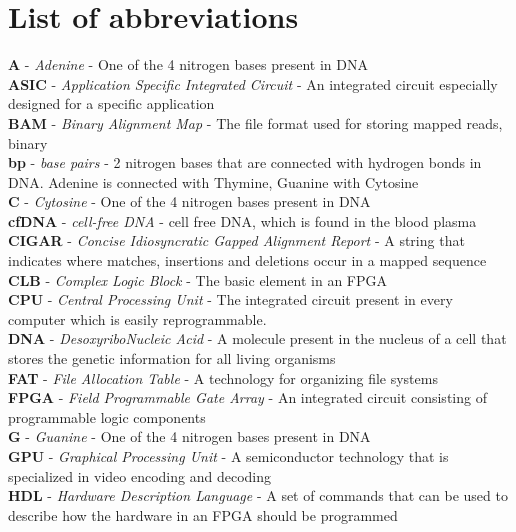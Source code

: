\chapter*{List of abbreviations}


\textbf{A} - \textit{Adenine} - One of the 4 nitrogen bases present in DNA \\
\textbf{ASIC} - \textit{Application Specific Integrated Circuit} - An integrated circuit especially designed for a specific application \\
\textbf{BAM} - \textit{Binary Alignment Map} - The file format used for storing mapped reads, binary \\
\textbf{bp} - \textit{base pairs} - 2 nitrogen bases that are connected with hydrogen bonds in DNA. Adenine is connected with Thymine, Guanine with Cytosine \\
\textbf{C} - \textit{Cytosine} - One of the 4 nitrogen bases present in DNA \\
\textbf{cfDNA} - \textit{cell-free DNA} - cell free DNA, which is found in the blood plasma \\
\textbf{CIGAR} - \textit{Concise Idiosyncratic Gapped Alignment Report} - A string that indicates where matches, insertions and deletions occur in a mapped sequence \\
\textbf{CLB} - \textit{Complex Logic Block} - The basic element in an FPGA \\
\textbf{CPU} - \textit{Central Processing Unit} - The integrated circuit present in every computer which is easily reprogrammable. \\
\textbf{DNA} - \textit{DesoxyriboNucleic Acid} - A molecule present in the nucleus of a cell  that stores the genetic information for all living organisms \\
\textbf{FAT} - \textit{File Allocation Table} - A technology for organizing file systems \\
\textbf{FPGA} - \textit{Field Programmable Gate Array} - An integrated circuit consisting of programmable logic components \\
\textbf{G} - \textit{Guanine} - One of the 4 nitrogen bases present in DNA \\
\textbf{GPU} - \textit{Graphical Processing Unit} - A semiconductor technology that is specialized in video encoding and decoding \\
\textbf{HDL} - \textit{Hardware Description Language} - A set of commands that can be used to describe how the hardware in an FPGA should be programmed \\
